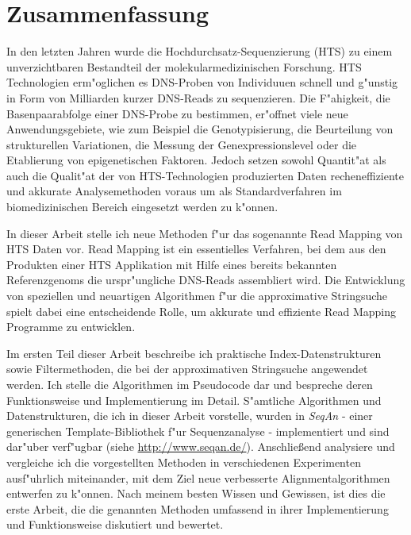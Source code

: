 \section*{Zusammenfassung}
\label{sec:abstract:de}


In den letzten Jahren wurde die Hochdurchsatz-Sequenzierung (HTS) zu einem unverzichtbaren Bestandteil der molekularmedizinischen Forschung. 
HTS Technologien erm"oglichen es DNS-Proben von Individuuen schnell und g"unstig in Form von Milliarden kurzer DNS-Reads zu sequenzieren.
Die F"ahigkeit, die Basenpaarabfolge einer DNS-Probe zu bestimmen, er"offnet viele neue Anwendungsgebiete, wie zum Beispiel die Genotypisierung, die Beurteilung von strukturellen Variationen, die Messung der Genexpressionslevel oder die Etablierung von epigenetischen Faktoren.
Jedoch setzen sowohl Quantit"at als auch die Qualit"at der von HTS-Technologien produzierten Daten recheneffiziente und akkurate Analysemethoden voraus um als Standardverfahren im biomedizinischen Bereich eingesetzt werden zu k"onnen.

In dieser Arbeit stelle ich neue Methoden f"ur das sogenannte Read Mapping von HTS Daten vor.
Read Mapping ist ein essentielles Verfahren, bei dem aus den Produkten einer HTS Applikation mit Hilfe eines bereits bekannten Referenzgenoms die urspr"ungliche DNS-Reads assembliert wird. 
Die Entwicklung von speziellen und neuartigen Algorithmen f"ur die approximative Stringsuche spielt dabei eine entscheidende Rolle, um akkurate und effiziente Read Mapping Programme zu entwicklen.

Im ersten Teil dieser Arbeit beschreibe ich praktische Index-Datenstrukturen sowie Filtermethoden, die bei der approximativen Stringsuche angewendet werden. Ich stelle die Algorithmen im Pseudocode dar und bespreche deren Funktionsweise und Implementierung im Detail.
S"amtliche Algorithmen und Datenstrukturen, die ich in dieser Arbeit vorstelle, wurden in \emph{SeqAn} - einer generischen \CC Template-Bibliothek f"ur Sequenzanalyse - implementiert und sind dar"uber verf"ugbar (siehe  \url{http://www.seqan.de/}).
Anschlie{\ss}end analysiere und vergleiche ich die vorgestellten Methoden in verschiedenen Experimenten ausf"uhrlich miteinander, mit dem Ziel neue verbesserte Alignmentalgorithmen entwerfen zu k"onnen.
Nach meinem besten Wissen und Gewissen, ist dies die erste Arbeit, die die genannten Methoden umfassend in ihrer Implementierung und Funktionsweise diskutiert und bewertet.

